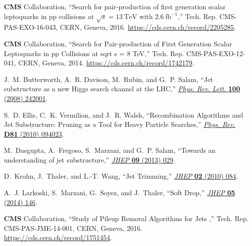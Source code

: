\begin{thebibliography}{99}
{\bfseries CMS} Collaboration, ``{Search for pair-production of first
  generation scalar leptoquarks in pp collisions at $\sqrt{s}=13~\mathrm{TeV}$
  with $2.6~\mathrm{fb}^{-1}$},'' Tech. Rep. CMS-PAS-EXO-16-043, CERN, Geneva,
  2016.
\newblock \url{https://cds.cern.ch/record/2205285}.

{\bfseries CMS} Collaboration, ``{Search for Pair-production of First
  Generation Scalar Leptoquarks in pp Collisions at sqrt s = 8 TeV},'' Tech.
  Rep. CMS-PAS-EXO-12-041, CERN, Geneva, 2014.
\newblock \url{https://cds.cern.ch/record/1742179}.

J.~M. Butterworth, A.~R. Davison, M.~Rubin, and G.~P. Salam, ``{Jet
  substructure as a new Higgs search channel at the LHC},''
  \href{http://dx.doi.org/10.1103/PhysRevLett.100.242001}{{\em Phys. Rev.
  Lett.} {\bfseries 100} (2008) 242001}.

S.~D. Ellis, C.~K. Vermilion, and J.~R. Walsh, ``{Recombination Algorithms and
  Jet Substructure: Pruning as a Tool for Heavy Particle Searches},''
  \href{http://dx.doi.org/10.1103/PhysRevD.81.094023}{{\em Phys. Rev.}
  {\bfseries D81} (2010) 094023}.

M.~Dasgupta, A.~Fregoso, S.~Marzani, and G.~P. Salam, ``{Towards an
  understanding of jet substructure},''
  \href{http://dx.doi.org/10.1007/JHEP09(2013)029}{{\em JHEP} {\bfseries 09}
  (2013) 029}.

D.~Krohn, J.~Thaler, and L.-T. Wang, ``{Jet Trimming},''
  \href{http://dx.doi.org/10.1007/JHEP02(2010)084}{{\em JHEP} {\bfseries 02}
  (2010) 084}.

A.~J. Larkoski, S.~Marzani, G.~Soyez, and J.~Thaler, ``{Soft Drop},''
  \href{http://dx.doi.org/10.1007/JHEP05(2014)146}{{\em JHEP} {\bfseries 05}
  (2014) 146}.

{\bfseries CMS} Collaboration, ``{Study of Pileup Removal Algorithms for Jets
  },'' Tech. Rep. CMS-PAS-JME-14-001, CERN, Geneva, 2016.
\newblock \url{https://cds.cern.ch/record/1751454}.

\begin{comment}


\end{comment}
\end{thebibliography}

